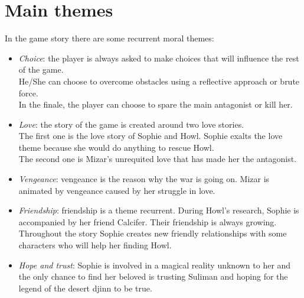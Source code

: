 \pagebreak %

\section{Main themes}

In the game story there are some recurrent moral themes:

\begin{itemize}
\item \textit{Choice}: the player is always asked to make choices that will influence the rest of the game. \\
  He/She can choose to overcome obstacles using a reflective approach or brute force. \\
  In the finale, the player can choose to spare the main antagonist or kill her.

\item \textit{Love}: the story of the game is created around two love stories. \\
  The first one is the love story of Sophie and Howl. Sophie exalts the love theme because she would do anything to rescue Howl. \\
  The second one is Mizar’s unrequited love that has made her the antagonist.

\item \textit{Vengeance}: vengeance is the reason why the war is going on. Mizar is animated by vengeance caused by her struggle in love.


\item \textit{Friendship}: friendship is a theme recurrent. During Howl's research, Sophie is accompanied by her friend Calcifer. Their friendship is always growing. Throughout the story Sophie creates new friendly relationships with some characters who will help her finding Howl.

\item \textit{Hope and trust}: Sophie is involved in a magical reality unknown to her and the only chance to find her beloved is trusting Suliman and hoping for the legend of the desert djinn  to be true.

\end{itemize}
